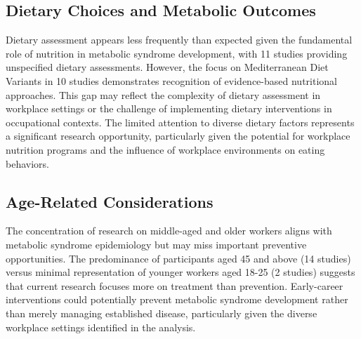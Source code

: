 \subsection{Dietary Choices and Metabolic Outcomes}
Dietary assessment appears less frequently than expected given the fundamental role of nutrition in metabolic syndrome development, with 11 studies providing unspecified dietary assessments. However, the focus on Mediterranean Diet Variants in 10 studies demonstrates recognition of evidence-based nutritional approaches. This gap may reflect the complexity of dietary assessment in workplace settings or the challenge of implementing dietary interventions in occupational contexts. The limited attention to diverse dietary factors represents a significant research opportunity, particularly given the potential for workplace nutrition programs and the influence of workplace environments on eating behaviors.
\subsection{Age-Related Considerations}
The concentration of research on middle-aged and older workers aligns with metabolic syndrome epidemiology but may miss important preventive opportunities. The predominance of participants aged 45 and above (14 studies) versus minimal representation of younger workers aged 18-25 (2 studies) suggests that current research focuses more on treatment than prevention. Early-career interventions could potentially prevent metabolic syndrome development rather than merely managing established disease, particularly given the diverse workplace settings identified in the analysis.








